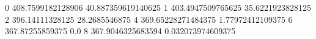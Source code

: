 0 408.7599182128906 40.887359619140625
1 403.4947509765625 35.6221923828125
2 396.14111328125 28.2685546875
4 369.65228271484375 1.77972412109375
6 367.87255859375 0.0
8 367.9046325683594 0.032073974609375
